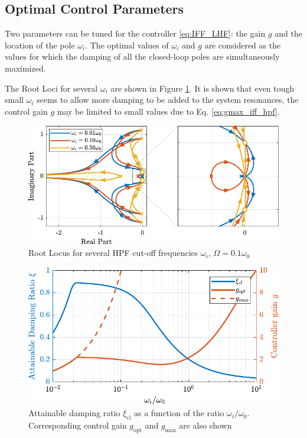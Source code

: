 \documentclass{ISMA_USD2020}
\begin{document}
\subsection{Optimal Control Parameters}
\label{sec:org9dc1d7f}

Two parameters can be tuned for the controller \eqref{eq:IFF_LHF}: the gain \(g\) and the location of the pole \(\omega_i\).
The optimal values of \(\omega_i\) and \(g\) are considered as the values for which the damping of all the closed-loop poles are simultaneously maximized.

The Root Loci for several \(\omega_i\) are shown in Figure \ref{fig:root_locus_wi_modified_iff}.
It is shown that even tough small \(\omega_i\) seems to allow more damping to be added to the system resonances, the control gain \(g\) may be limited to small values due to Eq. \eqref{eq:gmax_iff_hpf}.

\begin{figure}[htbp]
\centering
\includegraphics[scale=1]{figs/root_locus_wi_modified_iff.pdf}
\caption{\label{fig:root_locus_wi_modified_iff}Root Locus for several HPF cut-off frequencies \(\omega_i\), \(\Omega = 0.1 \omega_0\)}
\end{figure}

\begin{figure}[htbp]
\centering
\includegraphics[scale=1]{figs/mod_iff_damping_wi.pdf}
\caption{\label{fig:mod_iff_damping_wi}Attainable damping ratio \(\xi_\text{cl}\) as a function of the ratio \(\omega_i/\omega_0\). Corresponding control gain \(g_\text{opt}\) and \(g_\text{max}\) are also shown}
\end{figure}
\end{document}
